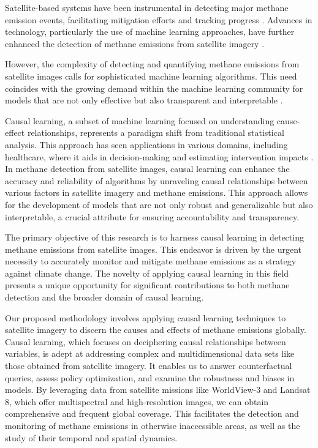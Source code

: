 Satellite-based systems have been instrumental in detecting major methane emission events, facilitating mitigation efforts and tracking progress \cite{eo_portal_iss_2023, eo_portal_copernicus_2012, eo_portal_gosat_gw_2023, ghgsat_ghgsat_2023, writer_methane_tracking_2023}. Advances in technology, particularly the use of machine learning approaches, have further enhanced the detection of methane emissions from satellite imagery \cite{irakulis_loitxate_satellites_2022, maasakkers_using_2022, sherwin_single_blind_2023, joyce_using_2023, Prasad2020, wu2020deep, kumar_deep_2020}.

However, the complexity of detecting and quantifying methane emissions from satellite images calls for sophisticated machine learning algorithms. This need coincides with the growing demand within the machine learning community for models that are not only effective but also transparent and interpretable \cite{roscher_explainable_2020, hall_review_2022}.

Causal learning, a subset of machine learning focused on understanding cause-effect relationships, represents a paradigm shift from traditional statistical analysis. This approach has seen applications in various domains, including healthcare, where it aids in decision-making and estimating intervention impacts \cite{pearl_causal_2009, verboven_combining_2022, subramanian_estimating_2023, otgonbaatar_causality_2022, angell_estimating_2021, osazuwa_ness_causal_2022}. In methane detection from satellite images, causal learning can enhance the accuracy and reliability of algorithms by unraveling causal relationships between various factors in satellite imagery and methane emissions. This approach allows for the development of models that are not only robust and generalizable but also interpretable, a crucial attribute for ensuring accountability and transparency.

The primary objective of this research is to harness causal learning in detecting methane emissions from satellite images. This endeavor is driven by the urgent necessity to accurately monitor and mitigate methane emissions as a strategy against climate change. The novelty of applying causal learning in this field presents a unique opportunity for significant contributions to both methane detection and the broader domain of causal learning.

Our proposed methodology involves applying causal learning techniques to satellite imagery to discern the causes and effects of methane emissions globally. Causal learning, which focuses on deciphering causal relationships between variables, is adept at addressing complex and multidimensional data sets like those obtained from satellite imagery. It enables us to answer counterfactual queries, assess policy optimization, and examine the robustness and biases in models. By leveraging data from satellite missions like WorldView-3 and Landsat 8, which offer multispectral and high-resolution images, we can obtain comprehensive and frequent global coverage. This facilitates the detection and monitoring of methane emissions in otherwise inaccessible areas, as well as the study of their temporal and spatial dynamics.

